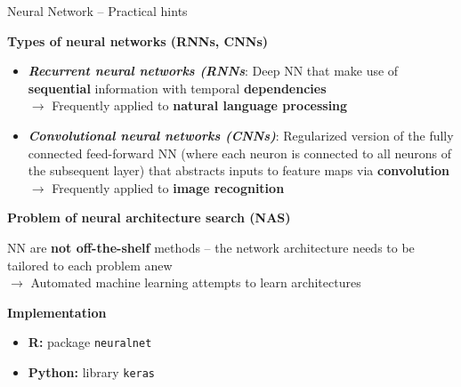 \documentclass[11pt,compress,t,notes=noshow, xcolor=table]{beamer}
\newcommand{\bfit}[1]{\textbf{\textit{#1}}}
\newcommand{\highlight}[1]{\textcolor{highlightcol}{\textbf{#1}}}
\let\code=\texttt
\begin{document}
\begin{frame}{Neural Network -- Practical hints}

\footnotesize

\highlight{Types of neural networks (RNNs, CNNs)}

\begin{itemize}
  \item \bfit{Recurrent neural networks (RNNs}: Deep NN that make use of 
  \textbf{sequential} information with temporal \textbf{dependencies} \\
  $\rightarrow$ Frequently applied to \textbf{natural language processing}
  \item \bfit{Convolutional neural networks (CNNs)}: Regularized version of the 
  fully connected feed-forward NN (where each neuron is connected to all 
  neurons of the subsequent layer) that abstracts inputs to feature maps via 
  \textbf{convolution} \\
  $\rightarrow$ Frequently applied to \textbf{image recognition}

\end{itemize}

\medskip

\highlight{Problem of neural architecture search (NAS)}

NN are \textbf{not off-the-shelf} methods -- the network architecture needs to 
be tailored to each problem anew \\
$\rightarrow$ Automated machine learning attempts to learn architectures

\medskip
 
\highlight{Implementation}

\begin{itemize}
  \item \textbf{R:} package \code{neuralnet}
  \item \textbf{Python:} library \code{keras}
\end{itemize}

\end{frame}
\end{document}
